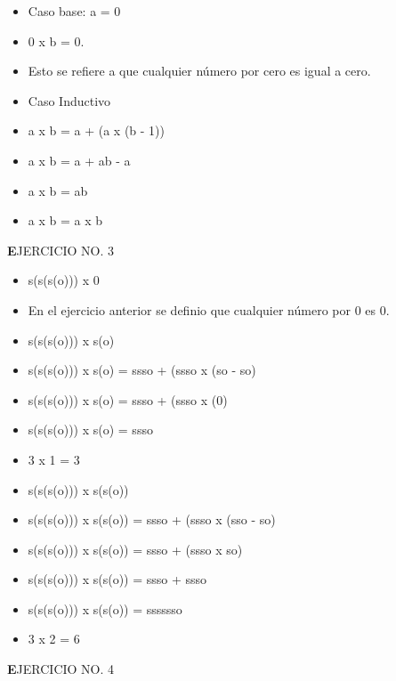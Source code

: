\documentclass{article}
\begin{document}
\begin{itemize}
\item Caso base: a = 0
\item 0 x b = 0.
\item Esto se refiere a que cualquier número por cero es igual a cero.
\item Caso Inductivo 
\item a x b = a + (a x (b - 1))
\item a x b = a + ab - a 
\item a x b = ab
\item a x b = a x b
\end{itemize}
\newline
\begin{center}
\textbf EJERCICIO NO. 3
\end{center}
\begin{itemize}
\item s(s(s(o))) x 0
\item En el ejercicio anterior se definio que cualquier número por 0 es 0. 
\newline
\item s(s(s(o))) x s(o) 
\item s(s(s(o))) x s(o) = ssso + (ssso x (so - so)
\item s(s(s(o))) x s(o) = ssso + (ssso x (0)
\item s(s(s(o))) x s(o) = ssso
\item 3 x 1 = 3
\newline
\item s(s(s(o))) x s(s(o))
\item s(s(s(o))) x s(s(o)) = ssso + (ssso x (sso - so)
\item s(s(s(o))) x s(s(o)) = ssso + (ssso x so)
\item s(s(s(o))) x s(s(o)) = ssso + ssso
\item s(s(s(o))) x s(s(o)) = sssssso
\item 3 x 2 = 6
\end{itemize}
\newline
\begin{center}
\textbf EJERCICIO NO. 4
\end{center}
\end{document}
